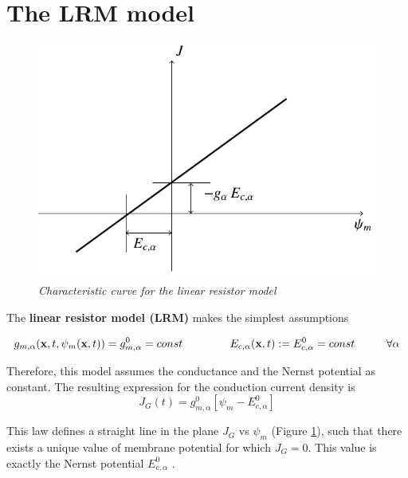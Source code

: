 \documentclass[12pt, a4paper]{report}
\begin{document}
\section{The LRM model}

\begin{figure}[H]
	\begin{center}
		\includegraphics[scale=0.65]{LRM.png} 
	\end{center} 
	\caption{\textit{Characteristic curve for the linear resistor model}} \label{LRM}
	
\end{figure}

The \textbf{linear resistor model (LRM)} makes the simplest assumptions 

\begin{equation}
g_{m,\alpha}(\textbf{x},t,\psi_m(\textbf{x},t)) = g_{m,\alpha}^0 = const \hspace{1.5 cm} E_{c,\alpha}(\textbf{x},t) := E_{c,\alpha}^0 = const \hspace{1cm} \forall \alpha
\end{equation}

Therefore, this model assumes the conductance and the Nernst potential as constant.
The resulting expression for the conduction current density is
\begin{equation}
J_G(t) = g_{m,\alpha}^0 [\psi_m -  E_{c,\alpha}^0]
\end{equation}

This law defines a straight line in the plane $J_G$ vs $\psi_m$ (Figure \ref*{LRM}), such that there exists a unique value of membrane potential for which $J_G=0$. This value is exactly the Nernst potential $E_{c,\alpha}^0$ .
\end{document}
